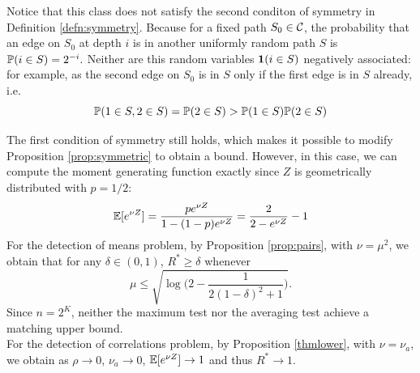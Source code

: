 \documentclass[10pt, oneside]{article}
\begin{document}
Notice that this class does not satisfy the second conditon of symmetry in Definition \ref{defn:symmetry}. Because for a fixed path $S_0 \in {\mathcal C}$, the probability that an edge on $S_0$ at depth $i$ is in another uniformly random path $S$ is $\mathbb{P}(i \in S) = 2^{-i}.$ Neither are this random variables ${\bf 1}(i \in S)$ negatively associated: for example, as the second edge on $S_0$ is in $S$ only if the first edge is in $S$ already, i.e.
$$\mathbb{P}(1 \in S, 2 \in S) = \mathbb{P}(2 \in S) >\mathbb{P}(1 \in S)\mathbb{P}(2 \in S) $$

The first condition of symmetry still holds, which makes it possible to modify Proposition \ref{prop:symmetric} to obtain a bound. However, in this case, we can compute the moment generating function exactly since $Z$ is geometrically distributed with $p = 1/2:$
$$\mathbb{E}[e^{\nu Z}] = \frac{p e^{\nu Z}}{1 - (1-p)e^{\nu Z}} = \frac{2}{2 - e^{\nu Z}} - 1$$
For the detection of means problem, by Proposition \ref{prop:pairs}, with $\nu = \mu^2$, we obtain that for any $\delta\in(0,1)$, $R^* \ge\delta$ whenever
$$\mu\le\sqrt{\log\bigl(2-\frac{1}{2(1-\delta)^2 + 1}\bigr)}.$$
Since $n = 2^K$, neither the maximum test nor the averaging test achieve a matching upper bound.\\
For the detection of correlations problem, by Proposition \ref{thmlower}, with $\nu = \nu_a$, we obtain as $\rho \to 0$, $\nu_a \to 0$, $\mathbb{E}[e^{\nu Z}] \to 1$ and thus  $R^* \to 1$.
\end{document}
